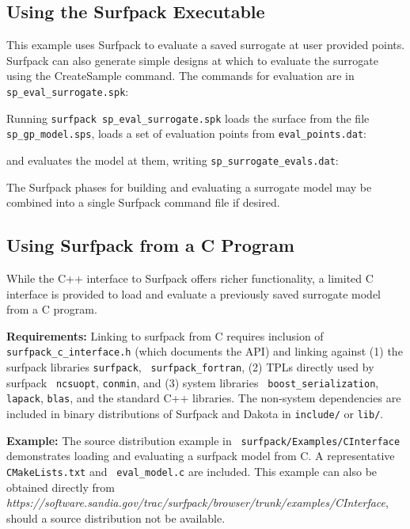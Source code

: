 \documentclass{article}
\begin{document}
\subsection{Using the Surfpack Executable}

This example uses Surfpack to evaluate a saved surrogate at user
provided points.  Surfpack can also generate simple designs at which
to evaluate the surrogate using the CreateSample command.  The
commands for evaluation are in {\tt sp\_eval\_surrogate.spk}:\\
\begin{bigbox}

\end{bigbox}
Running {\tt surfpack sp\_eval\_surrogate.spk} loads the surface from
the file {\tt sp\_gp\_model.sps}, loads a
set of evaluation points from {\tt eval\_points.dat}:\\
\begin{bigbox}

\end{bigbox}

and evaluates the model at them, writing {\tt sp\_surrogate\_evals.dat}:\\
\begin{bigbox}

\end{bigbox}

The Surfpack phases for building and evaluating a surrogate model may
be combined into a single Surfpack command file if desired.

\subsection{Using Surfpack from a C Program}

While the C++ interface to Surfpack offers richer functionality, a
limited C interface is provided to load and evaluate a previously
saved surrogate model from a C program.

{\bf Requirements:} Linking to surfpack from C requires inclusion of {\tt
  surfpack\_c\_interface.h} (which documents the API) and linking
against (1) the surfpack libraries {\tt surfpack}, {\tt
  surfpack\_fortran}, (2) TPLs directly used by surfpack {\tt
  ncsuopt}, {\tt conmin}, and (3) system libraries {\tt
  boost\_serialization}, {\tt lapack}, {\tt blas}, and the standard
C++ libraries.  The non-system dependencies are included in binary
distributions of Surfpack and Dakota in {\tt include/} or {\tt lib/}.

{\bf Example:} The source distribution example in {\tt
  surfpack/Examples/CInterface} demonstrates loading and evaluating a
surfpack model from C.  A representative {\tt CMakeLists.txt} and {\tt
  eval\_model.c} are included.  This example can also be obtained
directly from \\
{\em
  https://software.sandia.gov/trac/surfpack/browser/trunk/examples/CInterface},
should a source distribution not be available.
\end{document}
